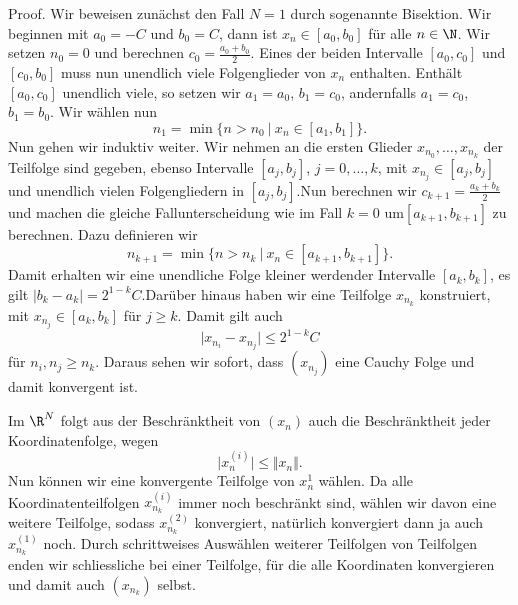 \documentclass[letterpaper,10pt,english]{jupyterBook}
\begin{document}
\begin{emphBox}{}{}
Proof.  Wir beweisen zunächst den Fall \(N=1\) durch sogenannte Bisektion. Wir beginnen mit \(a_0=-C\) und \(b_0=C\), dann ist \(x_n \in [a_0,b_0]\) für alle \(n \in \N\). Wir setzen \(n_0 =0\) und berechnen \(c_0=\frac{a_0+b_0}2\). Eines der beiden Intervalle \([a_0,c_0]\) und \([c_0,b_0]\) muss nun unendlich viele Folgenglieder von \(x_n\) enthalten. Enthält \([a_0,c_0]\) unendlich viele, so setzen wir \(a_1=a_0\), \(b_1=c_0\), andernfalls \(a_1=c_0\), \(b_1=b_0\). Wir wählen nun
\begin{equation*}
 n_1 = \min\{n > n_0~|~x_n \in [a_1,b_1] \}.
\end{equation*}
Nun gehen wir induktiv weiter.
Wir nehmen an die ersten Glieder \(x_{n_0},\ldots,x_{n_k}\) der Teilfolge sind gegeben, ebenso Intervalle \([a_j,b_j]\), \(j=0,\ldots,k\),  mit \(x_{n_j} \in [a_j,b_j]\) und unendlich vielen Folgengliedern in \( [a_j,b_j]\).Nun berechnen wir \(c_{k+1}= \frac{a_k + b_k}2\) und machen die gleiche Fallunterscheidung wie im Fall \(k=0\) um\([a_{k+1},b_{k+1}]\) zu berechnen. Dazu definieren wir
\begin{equation*}
 n_{k+1} = \min\{n > n_k~|~x_n \in [a_{k+1},b_{k+1}] \}.
\end{equation*}
Damit erhalten wir eine unendliche Folge kleiner werdender Intervalle \([a_k,b_k]\), es gilt \(|b_k - a_k|=2^{1-k}C\).Darüber hinaus haben wir eine Teilfolge \(x_{n_k}\) konstruiert, mit \(x_{n_j} \in [a_k,b_k]\) für \(j \geq k\). Damit gilt auch
\begin{equation*}
 \vert x_{n_i} - x_{n_j} \vert \leq 2^{1-k} C
\end{equation*}
für \(n_i, n_j \geq n_k. \) Daraus sehen wir sofort, dass \((x_{n_j})\) eine Cauchy Folge und damit konvergent ist.

Im \(\R^N\) folgt aus der Beschränktheit von \((x_n)\) auch die Beschränktheit jeder Koordinatenfolge, wegen
\begin{equation*}
 \vert x_n^{(i)} \vert \leq \Vert x_n \Vert .
\end{equation*}
Nun können wir eine konvergente Teilfolge von \(x_n^{1}\) wählen. Da alle Koordinatenteilfolgen \(x_{n_k}^{(i)}\) immer noch beschränkt sind, wählen wir davon eine weitere Teilfolge, sodass \(x_{n_k}^{(2)}\) konvergiert, natürlich konvergiert dann ja auch \(x_{n_k}^{(1)}\) noch. Durch schrittweises Auswählen weiterer Teilfolgen von Teilfolgen enden wir schliessliche bei einer Teilfolge, für die alle Koordinaten konvergieren und damit auch \((x_{n_k})\) selbst.
\end{emphBox}
\end{document}
